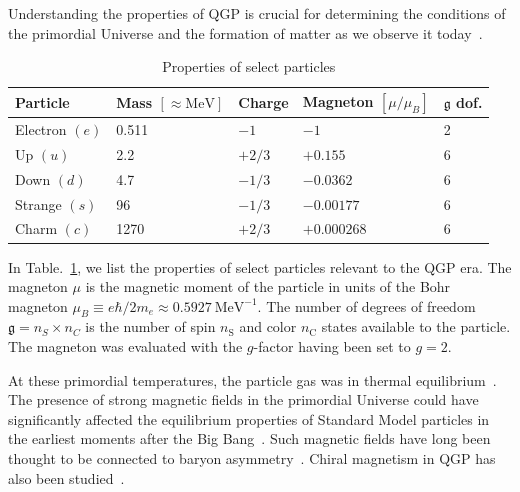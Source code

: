 \documentclass[epjST]{svjour}
\numberwithin{equation}{section}
\begin{document}
Understanding the properties of QGP is crucial for determining the conditions of the primordial Universe and the formation of matter as we observe it today~\cite{Uzan:2010pm,Uzan:2024ded,Grasso:2000wj,Widrow:2002ud,Kandus:2010nw}.
\begin{table}[h]
\centering
\caption{Properties of select particles}
\label{tab:particle_properties}
\begin{tabular}{@{}lllll@{}}
\toprule
\textbf{Particle} & \textbf{Mass} \([\approx\mathrm{MeV}]\) & \textbf{Charge} & \textbf{Magneton} \([\mu/\mu_{B}]\) & \(\mathfrak{g}\) \textbf{dof.} \\ 
\midrule
Electron    \((e)\) & 0.511 & \(-1\)    & \(-1\)         & 2 \\
Up          \((u)\) & 2.2   & \(+2/3\)  & \(+0.155\)     & 6 \\
Down        \((d)\) & 4.7   & \(-1/3\)  & \(-0.0362\)    & 6 \\
Strange     \((s)\) & 96    & \(-1/3\)  & \(-0.00177\)   & 6 \\
Charm       \((c)\) & 1270  & \(+2/3\)  & \(+0.000268\)  & 6 \\ 
\bottomrule
\end{tabular}
\end{table}
In Table.~\ref{tab:particle_properties}, we list the properties of select particles relevant to the QGP era. The magneton \(\mu\) is the magnetic moment of the particle in units of the Bohr magneton \(\mu_{B}\equiv e\hbar/2m_{e}\approx0.5927\ \mathrm{MeV}^{-1}\). The number of degrees of freedom \(\mathfrak{g}=n_{S}\times n_{C}\) is the number of spin \(n_\mathrm{S}\) and color \(n_\mathrm{C}\) states available to the particle. The magneton was evaluated with the \(g\)-factor having been set to \(g=2\).

At these primordial temperatures, the particle gas was in thermal equilibrium~\cite{Rafelski:2023emw}. The presence of strong magnetic fields in the primordial Universe could have significantly affected the equilibrium properties of Standard Model particles in the earliest moments after the Big Bang~\cite{Durrer:2013pga,Subramanian:2015lua}. Such magnetic fields have long been thought to be connected to baryon asymmetry~\cite{Vachaspati:1991nm,Baym:1995fk}. Chiral magnetism in QGP has also been studied~\cite{Fukushima:2008xe,Boyarsky:2011uy,Bali:2011qj}.
\end{document}
